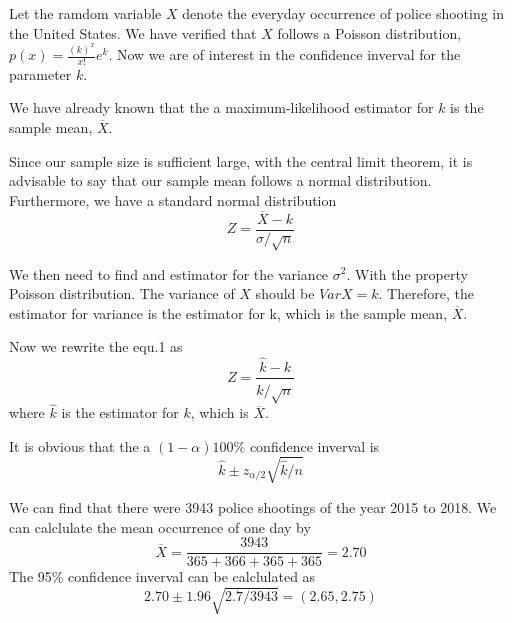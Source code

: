 \documentclass{article}[12pt]
\begin{document}
Let the ramdom variable $X$ denote the everyday occurrence of police shooting in the United States. We have verified that $X$ follows a Poisson distribution, $p(x)=\frac{(k)^{x}}{x !} e^{k}$. Now we are of interest in the confidence inverval for the parameter $k$. 

We have already known that the a maximum-likelihood estimator for $k$ is the sample mean, $\overline{X}$. 

Since our sample size is sufficient large, with the central limit theorem, it is advisable to say that our sample mean follows a normal distribution. Furthermore, we have a standard normal distribution
\begin{equation}
    Z=\frac{\overline{X}-k}{\sigma / \sqrt{n}} 
\end{equation}


We then need to find and estimator for the variance $\sigma^2$. With the property Poisson distribution. The variance of $X$ should be $Var X = k$. Therefore, the estimator for variance is the estimator for k, which is the sample mean, $\overline{X}$.

Now we rewrite the equ.1 as 
$$
Z = \frac{\hat{k}-k}{ \hat{k}/ \sqrt{n}}
$$
where $\hat{k}$ is the estimator for $k$, which is $\overline{X}$.

It is obvious that the a $(1 - \alpha)100\%$ confidence inverval is 
$$
\hat{k} \pm z_{\alpha / 2} \sqrt{\hat{k} / n}
$$

We can find that there were 3943 police shootings of the year 2015 to 2018. We can calclulate the mean occurrence of one day by
$$
\overline{X} = \frac{3943}{365+366+365+365} = 2.70 
$$
The 95\% confidence inverval can be calclulated as 
$$
2.70 \pm 1.96 \sqrt{2.7/3943} = (2.65 , 2.75)
$$
\end{document}
